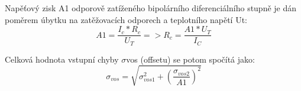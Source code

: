 Napěťový zisk A1 odporově zatíženého bipolárního diferenciálního stupně je dán poměrem úbytku na zatěžovacích odporech a teplotního napětí Ut:
\begin{equation}
A1=\frac{I_{c}*R_{c}}{U_{T}} => R_{c}=\frac{A1*U_{T}}{I_{C}}
\end{equation}

Celková hodnota vstupní chyby $\sigma$vos (offsetu) se potom spočítá jako:
\begin{equation}
\sigma_{vos}=\sqrt{\sigma_{vos1}^2+(\frac{\sigma_{vos2}}{A1})^2}
\end{equation}


















